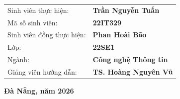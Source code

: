 \begin{titlepage}
\begin{center}
  \begin{flushleft}
  \hspace{2.2cm}
  \begin{tabular}{ll}
    \fontsize{13pt}{18pt}\selectfont Sinh viên thực hiện: & \fontsize{13pt}{18pt}\selectfont \textbf{Trần Nguyễn Tuấn} \\
    \fontsize{13pt}{18pt}\selectfont Mã số sinh viên:    & \fontsize{13pt}{18pt}\selectfont \textbf{22IT329} \\
    \fontsize{13pt}{18pt}\selectfont Sinh viên đồng thực hiện: & \fontsize{13pt}{18pt}\selectfont \textbf{Phan Hoài Bão} \\
    \fontsize{13pt}{18pt}\selectfont Lớp:                 & \fontsize{13pt}{18pt}\selectfont \textbf{22SE1} \\
    \fontsize{13pt}{18pt}\selectfont Ngành:               & \fontsize{13pt}{18pt}\selectfont \textbf{Công nghệ Thông tin} \\
    \fontsize{13pt}{18pt}\selectfont Giảng viên hướng dẫn:& \fontsize{13pt}{18pt}\selectfont \textbf{TS. Hoàng Nguyên Vũ} \\
  \end{tabular}
  \end{flushleft}

  \vfill

  {\fontsize{13pt}{16pt}\selectfont \textbf{Đà Nẵng, năm 2026}}
  \vspace{0.6cm}
\end{center}

\end{titlepage}
